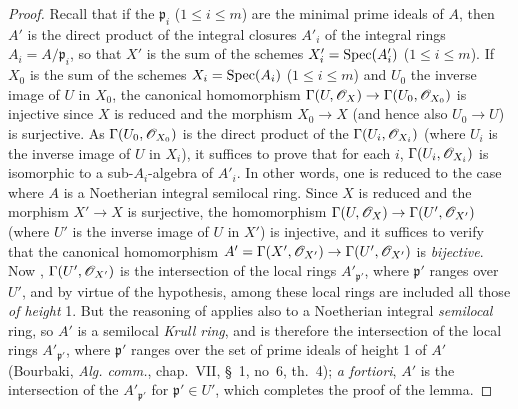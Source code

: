 \begin{proof}
Recall that if the $\mathfrak{p}_i$ ($1\leq i\leq m$) are the minimal prime ideals of $A$, then $A'$ is the direct product of the integral closures $A'_i$ of the integral rings $A_i=A/\mathfrak{p}_i$, so that $X'$ is the sum of the schemes $X'_i=\operatorname{Spec}(A'_i)$ ($1\leq i\leq m$).
If $X_0$ is the sum of the schemes $X_i=\operatorname{Spec}(A_i)$ ($1\leq i\leq m$) and $U_0$ the inverse image of $U$ in $X_0$, the canonical homomorphism $\Gamma(U,\mathscr{O}_{X})\to\Gamma(U_0,\mathscr{O}_{X_0})$ is injective since $X$ is reduced and the morphism $X_0\to X$ (and hence also $U_0\to U$) is surjective.
As $\Gamma(U_0,\mathscr{O}_{X_0})$ is the direct product of the $\Gamma(U_i,\mathscr{O}_{X_i})$ (where $U_i$ is the inverse image of $U$ in $X_i$), it suffices to prove that for each $i$, $\Gamma(U_i,\mathscr{O}_{X_i})$ is isomorphic to a sub-$A_i$-algebra of $A'_i$.
In other words, one is reduced to the case where $A$ is a Noetherian integral semilocal ring.
Since $X$ is reduced and the morphism $X'\to X$ is surjective, the homomorphism $\Gamma(U,\mathscr{O}_{X})\to\Gamma(U',\mathscr{O}_{X'})$ (where $U'$ is the inverse image of $U$ in $X'$) is injective, and it suffices to verify that the canonical homomorphism $A'=\Gamma(X',\mathscr{O}_{X'})\to\Gamma(U',\mathscr{O}_{X'})$ is \emph{bijective}.
Now , $\Gamma(U',\mathscr{O}_{X'})$ is the intersection of the local rings $A'_{\mathfrak{p}'}$, where $\mathfrak{p}'$ ranges over $U'$, and by virtue of the hypothesis, among these local rings are included all those \emph{of height} 1.
But the reasoning of  applies also to a Noetherian integral \emph{semilocal} ring, so $A'$ is a semilocal \emph{Krull ring}, and is therefore the intersection of the local rings $A'_{\mathfrak{p}'}$, where $\mathfrak{p}'$ ranges over the set of prime ideals of height 1 of $A'$ (Bourbaki, \emph{Alg. comm.}, chap.~VII, \S~1, no~6, th.~4);
\emph{a fortiori}, $A'$ is the intersection of the $A'_{\mathfrak{p}'}$ for $\mathfrak{p}'\in U'$, which completes the proof of the lemma.
\end{proof}


